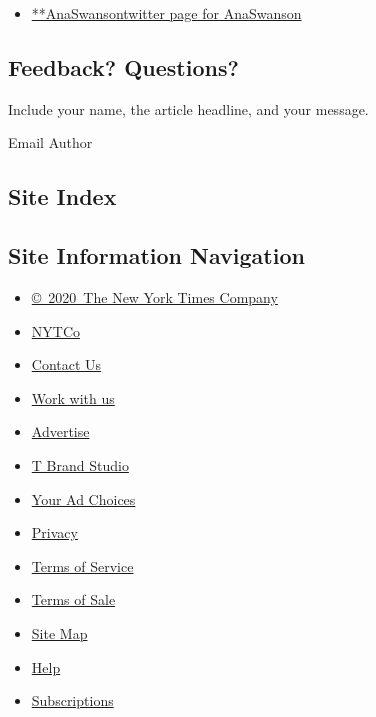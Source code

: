 \begin{itemize}
\tightlist
\item
  \href{https://twitter.com/AnaSwanson}{**AnaSwansontwitter page for
  AnaSwanson}
\end{itemize}

\hypertarget{feedback-questions}{%
\subsection{Feedback? Questions?}\label{feedback-questions}}

Include your name, the article headline, and your message.

Email Author

\hypertarget{site-index}{%
\subsection{Site Index}\label{site-index}}

\hypertarget{site-information-navigation}{%
\subsection{Site Information
Navigation}\label{site-information-navigation}}

\begin{itemize}
\tightlist
\item
  \href{https://help.nytimes.com/hc/en-us/articles/115014792127-Copyright-notice}{©~2020~The
  New York Times Company}
\end{itemize}

\begin{itemize}
\tightlist
\item
  \href{https://www.nytco.com/}{NYTCo}
\item
  \href{https://help.nytimes.com/hc/en-us/articles/115015385887-Contact-Us}{Contact
  Us}
\item
  \href{https://www.nytco.com/careers/}{Work with us}
\item
  \href{https://nytmediakit.com/}{Advertise}
\item
  \href{http://www.tbrandstudio.com/}{T Brand Studio}
\item
  \href{https://www.nytimes.com/privacy/cookie-policy\#how-do-i-manage-trackers}{Your
  Ad Choices}
\item
  \href{https://www.nytimes.com/privacy}{Privacy}
\item
  \href{https://help.nytimes.com/hc/en-us/articles/115014893428-Terms-of-service}{Terms
  of Service}
\item
  \href{https://help.nytimes.com/hc/en-us/articles/115014893968-Terms-of-sale}{Terms
  of Sale}
\item
  \href{https://spiderbites.nytimes.com}{Site Map}
\item
  \href{https://help.nytimes.com/hc/en-us}{Help}
\item
  \href{https://www.nytimes.com/subscription?campaignId=37WXW}{Subscriptions}
\end{itemize}
